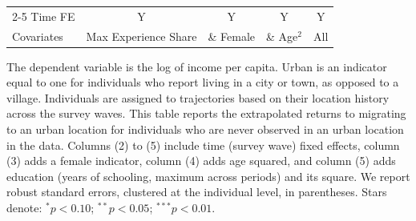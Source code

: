 \begin{table}[htbp]
\begin{threeparttable}
\begin{tabular}{l cccc}
\cmidrule{2-5} Time FE & Y & Y & Y & Y \\ Covariates & Max Experience Share & \& Female & \& Age$^2$ & All \\ \bottomrule \end{tabular} \begin{tablenotes}[flushleft] \footnotesize \item{The dependent variable is the log of income per capita. Urban is an indicator equal to one for individuals who report living in a city or town, as opposed to a village. Individuals are assigned to trajectories based on their location history across the survey waves. This table reports the extrapolated returns to migrating to an urban location for individuals who are never observed in an urban location in the data. Columns (2) to (5) include time (survey wave) fixed effects, column (3) adds a female indicator, column (4) adds age squared, and column (5) adds education (years of schooling, maximum across periods) and its square. We report robust standard errors, clustered at the individual level, in parentheses. Stars denote: $^{*} p<0.10$; $^{**} p<0.05$; $^{***} p<0.01$.} \end{tablenotes} \end{threeparttable} \end{table}
